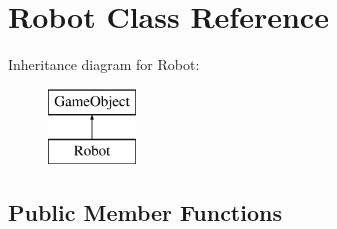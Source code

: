 \hypertarget{class_robot}{}\section{Robot Class Reference}
\label{class_robot}
Inheritance diagram for Robot\+:\begin{figure}[H]
\begin{center}
\leavevmode
\includegraphics[height=2.000000cm]{class_robot}
\end{center}
\end{figure}
\subsection*{Public Member Functions}

